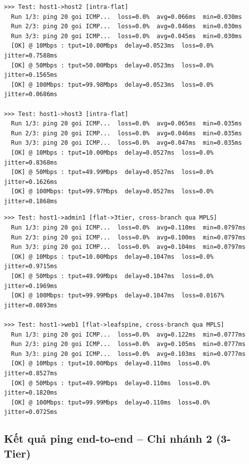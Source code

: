 \begin{lstlisting}[style=termstyle, caption={Ping intra-branch: host1 $\to$ host2 và host1 $\to$ host3 (Flat Network)}]
>>> Test: host1->host2 [intra-flat]
  Run 1/3: ping 20 goi ICMP...  loss=0.0%  avg=0.066ms  min=0.030ms
  Run 2/3: ping 20 goi ICMP...  loss=0.0%  avg=0.046ms  min=0.030ms
  Run 3/3: ping 20 goi ICMP...  loss=0.0%  avg=0.045ms  min=0.030ms
  [OK] @ 10Mbps : tput=10.00Mbps  delay=0.0523ms  loss=0.0%   jitter=0.7588ms
  [OK] @ 50Mbps : tput=50.00Mbps  delay=0.0523ms  loss=0.0%   jitter=0.1565ms
  [OK] @ 100Mbps: tput=99.98Mbps  delay=0.0523ms  loss=0.0%   jitter=0.0686ms

>>> Test: host1->host3 [intra-flat]
  Run 1/3: ping 20 goi ICMP...  loss=0.0%  avg=0.065ms  min=0.035ms
  Run 2/3: ping 20 goi ICMP...  loss=0.0%  avg=0.046ms  min=0.035ms
  Run 3/3: ping 20 goi ICMP...  loss=0.0%  avg=0.047ms  min=0.035ms
  [OK] @ 10Mbps : tput=10.00Mbps  delay=0.0527ms  loss=0.0%   jitter=0.8368ms
  [OK] @ 50Mbps : tput=49.99Mbps  delay=0.0527ms  loss=0.0%   jitter=0.1626ms
  [OK] @ 100Mbps: tput=99.97Mbps  delay=0.0527ms  loss=0.0%   jitter=0.1868ms
\end{lstlisting}

\begin{lstlisting}[style=termstyle, caption={Ping cross-branch: host1 (Flat) $\to$ admin1 (3-Tier) và web1 (Leaf-Spine)}]
>>> Test: host1->admin1 [flat->3tier, cross-branch qua MPLS]
  Run 1/3: ping 20 goi ICMP...  loss=0.0%  avg=0.110ms  min=0.0797ms
  Run 2/3: ping 20 goi ICMP...  loss=0.0%  avg=0.100ms  min=0.0797ms
  Run 3/3: ping 20 goi ICMP...  loss=0.0%  avg=0.104ms  min=0.0797ms
  [OK] @ 10Mbps : tput=10.00Mbps  delay=0.1047ms  loss=0.0%    jitter=0.9715ms
  [OK] @ 50Mbps : tput=49.99Mbps  delay=0.1047ms  loss=0.0%    jitter=0.1969ms
  [OK] @ 100Mbps: tput=99.99Mbps  delay=0.1047ms  loss=0.0167% jitter=0.0893ms

>>> Test: host1->web1 [flat->leafspine, cross-branch qua MPLS]
  Run 1/3: ping 20 goi ICMP...  loss=0.0%  avg=0.122ms  min=0.0777ms
  Run 2/3: ping 20 goi ICMP...  loss=0.0%  avg=0.105ms  min=0.0777ms
  Run 3/3: ping 20 goi ICMP...  loss=0.0%  avg=0.103ms  min=0.0777ms
  [OK] @ 10Mbps : tput=10.00Mbps  delay=0.110ms  loss=0.0%  jitter=0.8527ms
  [OK] @ 50Mbps : tput=49.99Mbps  delay=0.110ms  loss=0.0%  jitter=0.1820ms
  [OK] @ 100Mbps: tput=99.99Mbps  delay=0.110ms  loss=0.0%  jitter=0.0725ms
\end{lstlisting}

\subsection{Kết quả ping end-to-end -- Chi nhánh 2 (3-Tier)}

